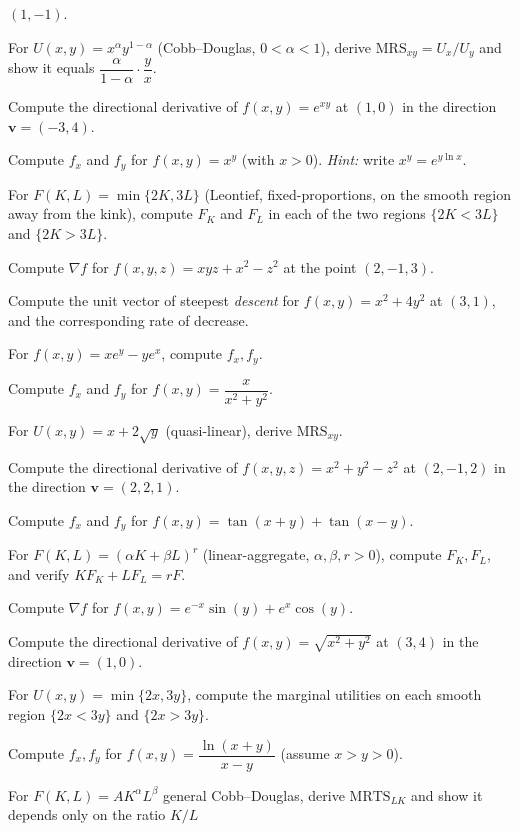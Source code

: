 \begin{problems}
        $(1,-1)$.
  \item For $U(x,y)=x^\alpha y^{1-\alpha}$ (Cobb--Douglas,
        $0<\alpha<1$), derive $\mathrm{MRS}_{xy}=U_x/U_y$ and show it
        equals $\dfrac{\alpha}{1-\alpha}\cdot\dfrac{y}{x}$.
  \item Compute the directional derivative of $f(x,y)=e^{xy}$ at $(1,0)$
        in the direction $\mathbf{v}=(-3,4)$.
  \item Compute $f_x$ and $f_y$ for $f(x,y)=x^y$ (with $x>0$).
        \emph{Hint:} write $x^y=e^{y\ln x}$.
  \item For $F(K,L)=\min\{2K,3L\}$ (Leontief, fixed-proportions, on the
        smooth region away from the kink), compute $F_K$ and $F_L$ in
        each of the two regions $\{2K<3L\}$ and $\{2K>3L\}$.
  \item Compute $\nabla f$ for $f(x,y,z)=xyz+x^2-z^2$ at the point
        $(2,-1,3)$.
  \item Compute the unit vector of steepest \emph{descent} for
        $f(x,y)=x^2+4y^2$ at $(3,1)$, and the corresponding rate of
        decrease.
  \item For $f(x,y)=xe^y-ye^x$, compute $f_x, f_y$.
  \item Compute $f_x$ and $f_y$ for $f(x,y)=\dfrac{x}{x^2+y^2}$.
  \item For $U(x,y)=x+2\sqrt{y}$ (quasi-linear), derive
        $\mathrm{MRS}_{xy}$.
  \item Compute the directional derivative of $f(x,y,z)=x^2+y^2-z^2$ at
        $(2,-1,2)$ in the direction $\mathbf{v}=(2,2,1)$.
  \item Compute $f_x$ and $f_y$ for $f(x,y)=\tan(x+y)+\tan(x-y)$.
  \item For $F(K,L)=(\alpha K+\beta L)^r$ (linear-aggregate,
        $\alpha,\beta,r>0$), compute $F_K, F_L$, and verify
        $KF_K+LF_L=rF$.
  \item Compute $\nabla f$ for $f(x,y)=e^{-x}\sin(y)+e^x\cos(y)$.
  \item Compute the directional derivative of $f(x,y)=\sqrt{x^2+y^2}$ at
        $(3,4)$ in the direction $\mathbf{v}=(1,0)$.
  \item For $U(x,y)=\min\{2x,3y\}$, compute the marginal utilities on
        each smooth region $\{2x<3y\}$ and $\{2x>3y\}$.
  \item Compute $f_x, f_y$ for $f(x,y)=\dfrac{\ln(x+y)}{x-y}$ (assume
        $x>y>0$).
  \item For $F(K,L)=AK^\alpha L^\beta$ general Cobb--Douglas, derive
        $\mathrm{MRTS}_{LK}$ and show it depends only on the ratio $K/L$

\end{problems}
